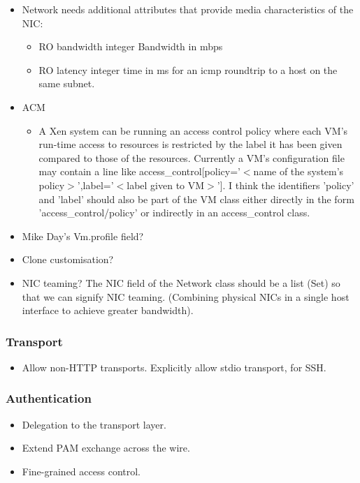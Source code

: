 \begin{itemize}
\item Network needs additional attributes that provide media characteristics
of the NIC:

\begin{itemize}

\item RO bandwidth integer Bandwidth in mbps
\item RO latency integer time in ms for an icmp roundtrip to a host on the
same subnet.

\end{itemize}

\item ACM
\begin{itemize}

\item A Xen system can be running an access control policy where each
VM's run-time access to resources is restricted by the label it has been given
compared to those of the resources. Currently a VM's configuration file may
contain a line like access\_control[policy='$<$name of the system's
policy$>$',label='$<$label given to VM$>$'].  I think the identifiers 'policy'
and 'label' should also be part of the VM class either directly in the form
'access\_control/policy' or indirectly in an access\_control class.

\end{itemize}

\item Mike Day's Vm.profile field?

\item Clone customisation?

\item NIC teaming?  The NIC field of the Network class should be a list (Set)
so that we can signify NIC teaming. (Combining physical NICs in a single host
interface to achieve greater bandwidth).

\end{itemize}

\subsubsection{Transport}

\begin{itemize}

\item Allow non-HTTP transports.  Explicitly allow stdio transport, for SSH.

\end{itemize}

\subsubsection{Authentication}

\begin{itemize}

\item Delegation to the transport layer.

\item Extend PAM exchange across the wire.

\item Fine-grained access control.

\end{itemize}
